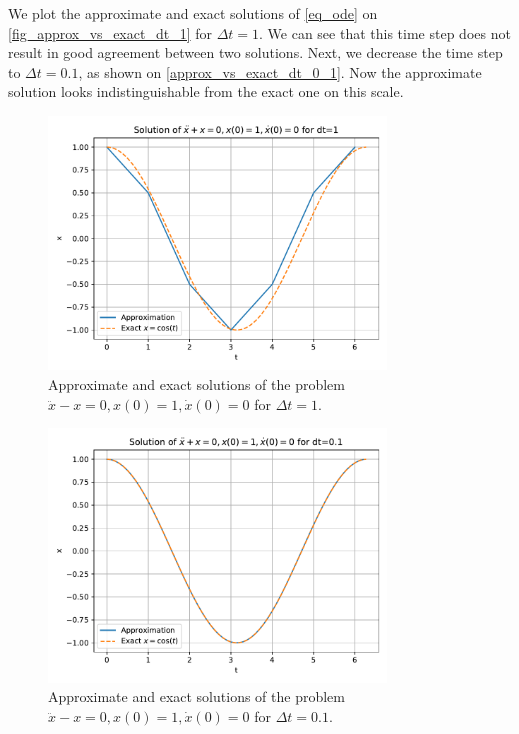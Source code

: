 We plot the approximate and exact solutions of \autoref{eq_ode} on \autoref{fig_approx_vs_exact_dt_1} for $\Delta t = 1$. We can see that this time step does not result in good agreement between two solutions. Next, we decrease the time step to $\Delta t = 0.1$, as shown on \autoref{approx_vs_exact_dt_0_1}. Now the approximate solution looks indistinguishable from the exact one on this scale.
\begin{figure}[H]
  \centering
  \includegraphics[width=0.8\textwidth]{figures/approx_vs_exact_dt_1.pdf}
  \caption{Approximate and exact solutions of the problem $\ddot{x} - x = 0, x(0)=1, \dot{x}(0)=0$ for $\Delta t = 1$.}
  \label{fig_approx_vs_exact_dt_1}
\end{figure}
\begin{figure}[H]
  \centering
  \includegraphics[width=0.8\textwidth]{figures/approx_vs_exact_dt_0_1.pdf}
  \caption{Approximate and exact solutions of the problem $\ddot{x} - x = 0, x(0)=1, \dot{x}(0)=0$ for $\Delta t = 0.1$.}
  \label{approx_vs_exact_dt_0_1}
\end{figure}


